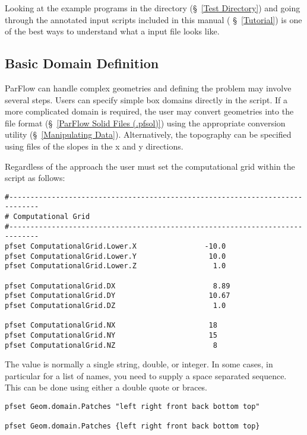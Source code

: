 Looking at the example programs in the  directory (\S~\ref{Test Directory}) and 
going through the annotated input scripts included in this manual ( \S~\ref{Tutorial}) is 
one of the best ways to understand what a \parflow{} input file looks like. 

\subsection{Basic Domain Definition}
\label{Defining a domain}

ParFlow can handle complex geometries and defining the problem may involve several steps.
Users can specify simple box domains directly in the  script. If a more complicated
domain is required, the user may convert geometries into the  file format 
(\S~\ref{ParFlow Solid Files (.pfsol)}) using the appropriate \pftools{} conversion utility 
(\S~\ref{Manipulating Data}).  Alternatively, the topography can be specified using 
 files of the slopes in the x and y directions.

Regardless of the approach the user must set the computational grid within the  
script as follows:

\begin{display}\begin{verbatim}
#-----------------------------------------------------------------------------
# Computational Grid
#-----------------------------------------------------------------------------
pfset ComputationalGrid.Lower.X                -10.0
pfset ComputationalGrid.Lower.Y                 10.0
pfset ComputationalGrid.Lower.Z                  1.0
 
pfset ComputationalGrid.DX                       8.89
pfset ComputationalGrid.DY                      10.67
pfset ComputationalGrid.DZ                       1.0
 
pfset ComputationalGrid.NX                      18
pfset ComputationalGrid.NY                      15
pfset ComputationalGrid.NZ                       8

\end{verbatim}\end{display}

The value is normally a single string, double, or integer.  In some cases,
in particular for a list of names, you need to supply a space separated
sequence.  This can be done using either a double quote or braces.

\begin{display}\begin{verbatim}
pfset Geom.domain.Patches "left right front back bottom top"

pfset Geom.domain.Patches {left right front back bottom top}
\end{verbatim}\end{display}

